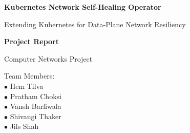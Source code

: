 \documentclass[12pt,a4paper]{article}
\begin{document}
\begin{titlepage}
    \begin{center}
        \vspace*{1cm}
        
        \Huge
        \textbf{Kubernetes Network Self-Healing Operator}
        
        \vspace{0.5cm}
        \LARGE
        Extending Kubernetes for Data-Plane Network Resiliency
        
        \vspace{1.5cm}
        
        \textbf{Project Report}
        
        \vfill
        
        \Large
        Computer Networks Project
        
        \vspace{0.8cm}
        
        \Large
        Team Members: \\[0.5cm]
        \large
        $\bullet$ Hem Tilva \\
        $\bullet$ Pratham Choksi \\
        $\bullet$ Vansh Barfiwala \\
        $\bullet$ Shivangi Thaker \\
        $\bullet$ Jils Shah
        
        \vspace{1.5cm}
        
    \end{center}
\end{titlepage}
\end{document}
